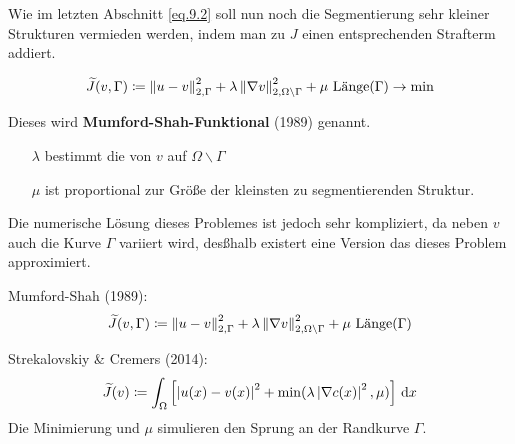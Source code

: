 Wie im letzten Abschnitt \ref{eq.9.2} soll nun noch die Segmentierung sehr kleiner Strukturen vermieden werden, indem man zu $J$ einen entsprechenden Strafterm addiert.

\begin{equation*}
\widetilde J(v,\Gamma)  \coloneqq  \left\| u-v \right\|_{2,\Gamma}^2 + \lambda \left\| \nabla v \right\|_{2,\Omega \backslash \Gamma}^2 + \mu \ \text{Länge}(\Gamma) \to \min
\end{equation*}

Dieses wird \textbf{Mumford-Shah-Funktional} (1989) genannt.
\begin{enumerate}
\item[$\lambda$] bestimmt die  von $v$ auf $\Omega \backslash \Gamma$
\item[$\mu$] ist proportional zur Größe der kleinsten zu segmentierenden Struktur.
\end{enumerate}
Die numerische Lösung dieses Problemes ist jedoch sehr kompliziert, da neben $v$ auch die Kurve $\Gamma$ variiert wird, desßhalb existert eine  Version das dieses Problem approximiert.

Mumford-Shah (1989):
\[\widetilde J(v,\Gamma)  \coloneqq  \norm{u-v}_{2,\Gamma}^2 + \lambda \norm{\nabla v}_{2,\Omega \backslash \Gamma}^2 + \mu \ \text{Länge}(\Gamma)\]

Strekalovskiy \& Cremers (2014):
\[\widetilde J(v)  \coloneqq  \int_\Omega \left[ \left| u(x) - v(x) \right|^2 + \min(\lambda \left| \nabla c(x) \right|^2, \mu) \right] \, {\operatorname{d}\!{x}} \]
Die Minimierung und $\mu$ simulieren den Sprung an der Randkurve $\Gamma$.
